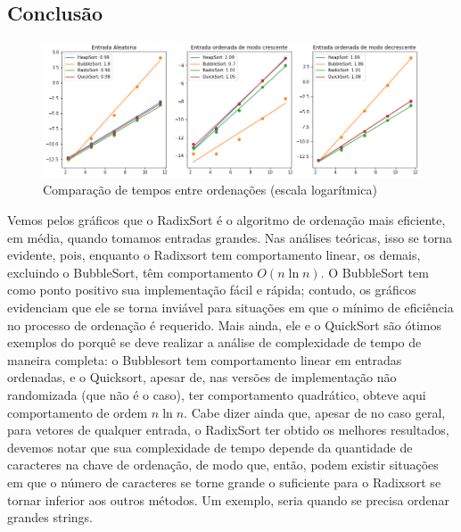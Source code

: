 \documentclass{article}
\begin{document}
\subsection{Conclusão}
%
\begin{figure}[h]
    \centering
    \includegraphics[width=1\textwidth]{comparacao.png}
    \caption{Comparação de tempos entre ordenações (escala logarítmica)}
\end{figure} \par
%
Vemos pelos gráficos que o RadixSort é o algoritmo de ordenação mais eficiente, em média, quando tomamos entradas grandes. Nas análises teóricas, isso se torna evidente, pois, enquanto o Radixsort tem comportamento linear, os demais, excluindo o BubbleSort, têm comportamento $O(n \ln n)$. O BubbleSort tem como ponto positivo sua implementação fácil e rápida; contudo, os gráficos evidenciam que ele se torna inviável para situações em que o mínimo de eficiência no processo de ordenação é requerido. Mais ainda, ele e o QuickSort são ótimos exemplos do porquê se deve realizar a análise de complexidade de tempo de maneira completa: o Bubblesort tem comportamento linear em entradas ordenadas, e o Quicksort, apesar de, nas versões de implementação não randomizada (que não é o caso), ter comportamento quadrático, obteve aqui comportamento de ordem $n\ln n$. Cabe dizer ainda que, apesar de no caso geral, para vetores de qualquer entrada, o RadixSort ter obtido os melhores resultados, devemos notar que sua complexidade de tempo depende da quantidade de caracteres na chave de ordenação, de modo que, então, podem existir situações em que o número de caracteres se torne grande o suficiente para o Radixsort se tornar inferior aos outros métodos. Um exemplo, seria quando se precisa ordenar grandes strings.
%
\end{document}
